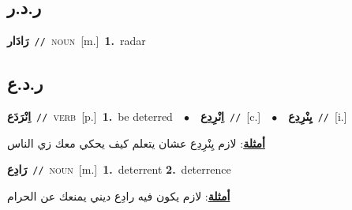 \documentclass[10pt,a4paper,twoside]{article} %
\begin{document}
\begin{multicols}{2}
\vspace{-3mm}
\subsection*{\color{blue}\foreignlanguage{arabic}{ر.د.ر}\color{blue}{ (ntws)}} 

{\setlength\topsep{0pt}\textbf{\foreignlanguage{arabic}{رَادَار}}\ {\color{gray}\texttt{//}\color{black}}\ \textsc{noun}\ [m.]\ \textbf{1.}~radar\ } \vspace{2mm}

\vspace{-3mm}
\subsection*{\color{blue}\foreignlanguage{arabic}{ر.د.ع}\color{blue}{}} 

{\setlength\topsep{0pt}\textbf{\foreignlanguage{arabic}{اِنْرَدَع}}\ {\color{gray}\texttt{//}\color{black}}\ \textsc{verb}\ [p.]\ \textbf{1.}~be deterred\ \ $\bullet$\ \ \setlength\topsep{0pt}\textbf{\foreignlanguage{arabic}{اِنْرِدِع}}\ {\color{gray}\texttt{//}\color{black}}\ [c.]\ \ $\bullet$\ \ \setlength\topsep{0pt}\textbf{\foreignlanguage{arabic}{يِنْرِدِع}}\ {\color{gray}\texttt{//}\color{black}}\ [i.]\  \begin{flushright}\color{gray}\foreignlanguage{arabic}{\textbf{\underline{\foreignlanguage{arabic}{أمثلة}}}: لازم يِنْرِدِع عشان يتعلم كيف يحكي معك زي الناس}\end{flushright}\color{black}} \vspace{2mm}

{\setlength\topsep{0pt}\textbf{\foreignlanguage{arabic}{رَادِع}}\ {\color{gray}\texttt{//}\color{black}}\ \textsc{noun}\ [m.]\ \textbf{1.}~deterrent  \textbf{2.}~deterrence\  \begin{flushright}\color{gray}\foreignlanguage{arabic}{\textbf{\underline{\foreignlanguage{arabic}{أمثلة}}}: لازم يكون فيه رادِع ديني يمنعك عن الحرام}\end{flushright}\color{black}} \vspace{2mm}


\end{multicols}
\end{document}
